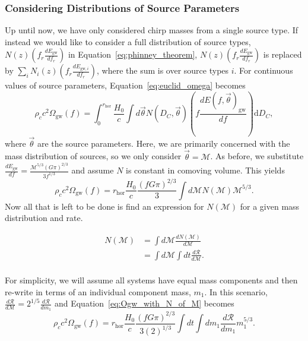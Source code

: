 \documentclass[]{article}
\newcommand{\Ogw}{\Omega_{\mathrm{gw}}}
\newcommand{\rhor}{r_{\text{hor}}}
\begin{document}
\subsubsection{Considering Distributions of Source Parameters}
Up until now, we have only considered chirp masses from a single source type.
If instead we would like to consider a full distribution of source types, $N(z) (f_r \frac{dE_{\mathrm{gw}}}{df_r})$ in Equation~\ref{eq:phinney_theorem}, $N(z) (f_r \frac{dE_{\mathrm{gw}}}{df_r})$ is replaced by $\sum_{i} N_i (z) (f_r \frac{dE_{\mathrm{gw},i}}{df_r})$, where the sum is over source types $i$. 
For continuous values of source parameters, Equation~\ref{eq:euclid_omega} becomes
\begin{equation*}
\rho_c c^2 \Ogw(f) =  \int_{0}^{\rhor} \frac{H_0}{c} \int d\vec{\theta} N(D_C,\vec{\theta}) (f \frac{dE(f,\vec{\theta})_{\mathrm{gw}}}{df}) \mathrm{d}D_C ,
\end{equation*}
where $\vec{\theta}$ are the source parameters. 
Here, we are primarily concerned with the mass distribution of sources, so we only consider $\vec{\theta} = \mathcal{M}$.
As before, we substitute $\frac{dE_{\mathrm{gw}}}{df} = \frac{\mathcal{M}^{5/3}(G\pi)^{2/3}}{3 f^{1/3}}$ and assume $N$ is constant in comoving volume. 
This yields
\begin{equation}
\rho_c c^2 \Ogw(f) =  \rhor \frac{H_0}{c} \frac{(f G \pi)^{2/3}}{3} \int d\mathcal{M} N(\mathcal{M}) \mathcal{M}^{5/3}  .
\label{eq:Ogw_with_N_of_M}
\end{equation}
Now all that is left to be done is find an expression for $N(\mathcal{M})$ for a given mass distribution and rate.

\begin{align*}
 N(\mathcal{M}) &= \int d\mathcal{M} \frac{d N(\mathcal{M})}{d\mathcal{M}} \\
  &= \int d\mathcal{M} \int dt \frac{d\mathcal{R}}{d\mathcal{M}}.\\
\end{align*}

For simplicity, we will assume all systems have equal mass components and then re-write in terms of an individual component mass, $m_1$.
In this scenario, $\frac{d\mathcal{R}}{d\mathcal{M}} = 2^{1/5} \frac{d\mathcal{R}}{d m_1}$ and Equation~\ref{eq:Ogw_with_N_of_M} becomes
\begin{equation}
\rho_c c^2 \Ogw(f) =  \rhor \frac{H_0}{c} \frac{(f G \pi)^{2/3}}{3 (2)^{1/3}} \int d t \int d m_1 \frac{d\mathcal{R}}{dm_1} m_1^{5/3} .
\label{eq:Ogw_with_R_of_M}
\end{equation}
\end{document}
